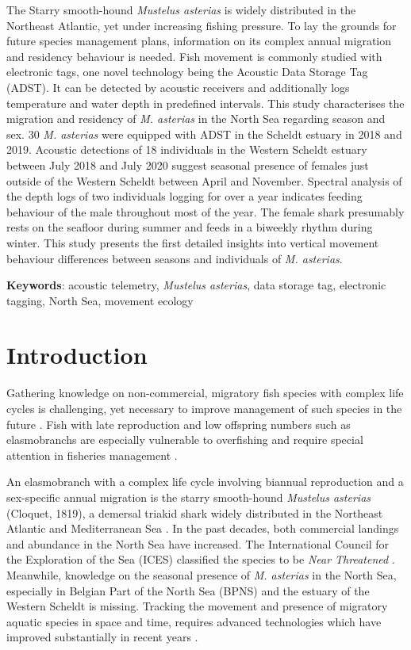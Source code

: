 \documentclass[
  authoryear,
  review,
  3p]{elsarticle}
\begin{document}
The Starry smooth-hound \emph{Mustelus asterias} is widely distributed
in the Northeast Atlantic, yet under increasing fishing pressure. To lay
the grounds for future species management plans, information on its
complex annual migration and residency behaviour is needed. Fish
movement is commonly studied with electronic tags, one novel technology
being the Acoustic Data Storage Tag (ADST). It can be detected by
acoustic receivers and additionally logs temperature and water depth in
predefined intervals. This study characterises the migration and
residency of \emph{M. asterias} in the North Sea regarding season and
sex. 30 \emph{M. asterias} were equipped with ADST in the Scheldt
estuary in 2018 and 2019. Acoustic detections of 18 individuals in the
Western Scheldt estuary between July 2018 and July 2020 suggest seasonal
presence of females just outside of the Western Scheldt between April
and November. Spectral analysis of the depth logs of two individuals
logging for over a year indicates feeding behaviour of the male
throughout most of the year. The female shark presumably rests on the
seafloor during summer and feeds in a biweekly rhythm during winter.
This study presents the first detailed insights into vertical movement
behaviour differences between seasons and individuals of \emph{M.
asterias}.

\textbf{Keywords}: acoustic telemetry, \emph{Mustelus asterias}, data
storage tag, electronic tagging, North Sea, movement ecology

\newpage{}

\hypertarget{sec-intro}{%
\section{Introduction}\label{sec-intro}}

Gathering knowledge on non-commercial, migratory fish species with
complex life cycles is challenging, yet necessary to improve management
of such species in the future \citep{brownscombe_2022}. Fish with late
reproduction and low offspring numbers such as elasmobranchs are
especially vulnerable to overfishing and require special attention in
fisheries management \citep{stevens_2000}.

An elasmobranch with a complex life cycle involving biannual
reproduction and a sex-specific annual migration is the starry
smooth-hound \emph{Mustelus asterias} (Cloquet, 1819), a demersal
triakid shark widely distributed in the Northeast Atlantic and
Mediterranean Sea \citep{breve_2016, griffiths_2020}. In the past
decades, both commercial landings
\citep{ices_2022, bitonporsmoguer_2022} and abundance in the North Sea
\citep{mccullyphillips_2015} have increased. The International Council
for the Exploration of the Sea (ICES) classified the species to be
\emph{Near Threatened} \citep{ices_2022}. Meanwhile, knowledge on the
seasonal presence of \emph{M. asterias} in the North Sea, especially in
Belgian Part of the North Sea (BPNS) and the estuary of the Western
Scheldt is missing. Tracking the movement and presence of migratory
aquatic species in space and time, requires advanced technologies which
have improved substantially in recent years \citep{whoriskey_2019}.
\end{document}

